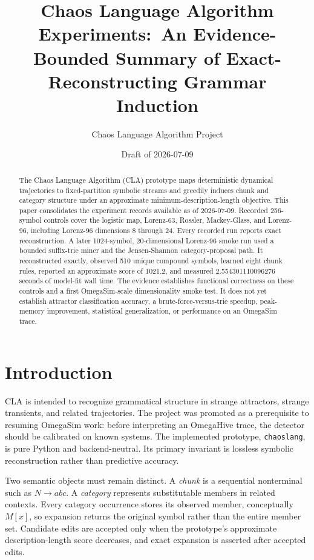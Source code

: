 \documentclass[11pt]{article}
\title{Chaos Language Algorithm Experiments:\
An Evidence-Bounded Summary of Exact-Reconstructing Grammar Induction}
\author{Chaos Language Algorithm Project}
\date{Draft of 2026-07-09}
\begin{document}
\maketitle

\begin{abstract}
The Chaos Language Algorithm (CLA) prototype maps deterministic dynamical
trajectories to fixed-partition symbolic streams and greedily induces chunk and
category structure under an approximate minimum-description-length objective.
This paper consolidates the experiment records available as of 2026-07-09.
Recorded 256-symbol controls cover the logistic map, Lorenz-63, Rossler,
Mackey-Glass, and Lorenz-96, including Lorenz-96 dimensions 8 through 24.
Every recorded run reports exact reconstruction. A later 1024-symbol,
20-dimensional Lorenz-96 smoke run used a bounded suffix-trie miner and the
Jensen-Shannon category-proposal path. It reconstructed exactly, observed 510
unique compound symbols, learned eight chunk rules, reported an approximate
score of 1021.2, and measured 2.554301110096276 seconds of model-fit wall time.
The evidence establishes functional correctness on these controls and a first
OmegaSim-scale dimensionality smoke test. It does not yet establish attractor
classification accuracy, a brute-force-versus-trie speedup, peak-memory
improvement, statistical generalization, or performance on an OmegaSim trace.
\end{abstract}

\section{Introduction}

CLA is intended to recognize grammatical structure in strange attractors,
strange transients, and related trajectories. The project was promoted as a
prerequisite to resuming OmegaSim work: before interpreting an OmegaHive trace,
the detector should be calibrated on known systems. The implemented prototype,
\texttt{chaoslang}, is pure Python and backend-neutral. Its primary invariant is
lossless symbolic reconstruction rather than predictive accuracy.

Two semantic objects must remain distinct. A \emph{chunk} is a sequential
nonterminal such as $N \rightarrow abc$. A \emph{category} represents
substitutable members in related contexts. Every category occurrence stores its
observed member, conceptually $M[x]$, so expansion returns the original symbol
rather than the entire member set. Candidate edits are accepted only when the
prototype's approximate description-length score decreases, and exact expansion
is asserted after accepted edits.
\end{document}

